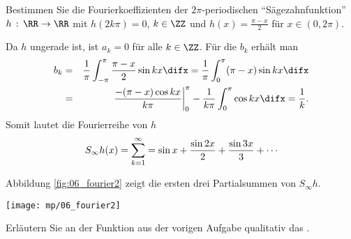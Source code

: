   \begin{frage}\label{07_saeg}
    Bestimmen Sie die Fourierkoeffizienten der $2\pi$-periodischen 
    "`Sägezahnfunktion"' 
    $h\,:\, \RR\to\RR$ 
    mit $h(2k\pi)=0$, $k\in\ZZ$ und $h(x)=\frac{\pi-x}{2}$ für $x\in (0,2\pi)$.
  \end{frage}

  \begin{antwort}
    Da $h$ ungerade ist, ist $a_k=0$ für alle $k\in \ZZ$. Für die $b_k$ 
    erhält man 
    \begin{eqnarray*}
      b_k &=& 
      \frac{1}{\pi}\int_{-\pi}^{\pi} \frac{\pi-x}{2} \sin kx \difx = 
      \frac{1}{\pi}\int_{0}^{\pi}(\pi-x)\sin kx \difx \\
      &=& 
      \left.\frac{-(\pi-x)\cos kx }{k\pi} \right|_0^\pi -
      \frac{1}{k\pi} \int_0^\pi \cos kx \difx = \frac{1}{k}.
    \end{eqnarray*}
    Somit lautet die Fourierreihe von $h$
    \begin{equation}
      S_{\infty} h(x) = \sum_{k=1}^{\infty}= \sin x+ \frac{\sin 2x}{2} +
      \frac{\sin 3x}{3}+\cdots 
      \notag
    \end{equation}

    Abbildung \ref{fig:06_fourier2} zeigt die ersten drei 
    Partialsummen von $S_{\infty} h$.

    \begin{center}
      \texttt{[image: mp/06\_fourier2]}
      \label{fig:06_fourier2}
    \end{center}

    \AntEnd
  \end{antwort}

  \begin{frage}
    Erläutern Sie an der Funktion aus der vorigen Aufgabe 
    qualitativ das .
  \end{frage}

